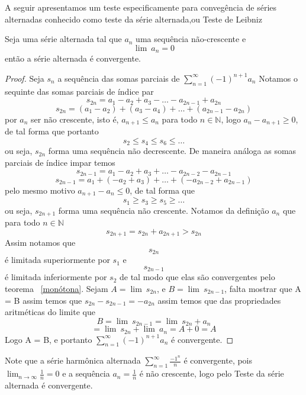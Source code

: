 A seguir apresentamos um teste especificamente para convegência 
de séries alternadas conhecido como teste da série alternada,ou Teste de Leibniz

\begin{teo}
    Seja uma série alternada tal que $a_n$ uma sequência não-crescente e
    $$\lim{\:} a_n = 0$$
    então a série alternada é convergente.
\end{teo}

\begin{proof}
    Seja $s_n$ a sequência das somas parciais de $\sum_{n =1}^{\infty} (-1)^{n+1} a_n$
    Notamos o sequinte das somas parciais de índice par
    $$s_{2n} = a_1 - a_2 +a_3 - \dots -a_{2n-1} + a_{2n}$$
    $$s_{2n} = (a_1 - a_2) + (a_3 - a_4) + \dots + (a_{2n-1} - a_{2n})$$
    por $a_n$ ser não crescente, isto é, $a_{n+1} \leq a_n$ para todo $n \in \mathbb{N}$,
    logo $a_n - a_{n+1} \geq 0$, de tal forma que portanto
    $$s_2 \leq s_4 \leq s_6 \leq  \dots $$
    ou seja, $s_{2n}$ forma uma sequência não decrescente.
    De maneira análoga as somas parciais de índice impar temos
    $$s_{2n-1} = a_1 - a_2 +a_3 + \dots -a_{2n-2} - a_{2n-1}$$
    $$s_{2n-1} =a_1 +(- a_2 + a_3) + \dots + (-a_{2n-2} + a_{2n-1})$$
    pelo mesmo motivo $a_{n+1} - a_n \leq 0$, de tal forma que
    $$s_1 \geq s_3 \geq s_5 \geq \dots $$
    ou seja, $s_{2n+1}$ forma uma sequência não crescente.
    Notamos da definição $a_n$ que para todo $n \in \mathbb{N}$
    $$ s_{2n+1} = s_{2n} + a_{2n+1} > s_{2n}$$
    Assim notamos que $$s_{2n}$$ é limitada superiormente por $s_1$ e
    $$s_{2n-1}$$ é limitada inferiormente por $s_2$ de tal modo que elas são
    convergentes pelo teorema ~\ref{monótona}.
    Sejam $A = \lim{\:} s_{2n}$, e $B = \lim{\:} s_{2n-1}$, falta mostrar que A = B
    assim temos que $s_{2n} - s_{2n-1} = -a_{2n}$ assim temos que
    das propriedades aritméticas do limite que
    $$ B = \lim{\:} s_{2n-1} = \lim{\:} s_{2n} + a_n$$
    $$ = \lim{\:} s_{2n} + \lim{\:} a_n = A + 0 = A$$
    Logo A = B, e portanto $\sum_{n =1}^{\infty} (-1)^{n+1} a_n$ é convergente.
\end{proof}

\begin{ex}
    Note que a série harmônica alternada $\sum_{n = 1}^{\infty} \frac{-1^n}{n}$
    é convergente, pois $\lim_{n \to \infty} \frac{1}{n} = 0$ e a sequência 
    $a_n = \frac{1}{n}$ é não crescente, logo pelo Teste da série alternada é
    convergente.
\end{ex}

